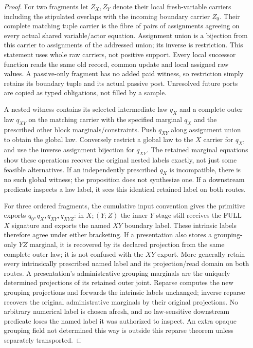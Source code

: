 \documentclass[11pt]{article}\usepackage{amsmath,amssymb,amsthm}
\begin{document}
\begin{proof}
For two fragments let $Z_X,Z_Y$ denote their local fresh-variable carriers including the stipulated overlaps with the incoming boundary carrier $Z_0$. Their complete matching tuple carrier is the fibre of pairs of assignments agreeing on every actual shared variable/actor equation. Assignment union is a bijection from this carrier to assignments of the addressed union; its inverse is restriction. This statement uses whole raw carriers, not positive support. Every local successor function reads the same old record, common update and local assigned raw values. A passive-only fragment has no added paid witness, so restriction simply retains its boundary tuple and its actual passive post. Unresolved future ports are copied as typed obligations, not filled by a sample.

A nested witness contains its selected intermediate law $q_X$ and a complete outer law $q_{XY}$ on the matching carrier with the specified marginal $q_X$ and the prescribed other block marginals/constraints. Push $q_{XY}$ along assignment union to obtain the global law. Conversely restrict a global law to the $X$ carrier for $q_X$, and use the inverse assignment bijection for $q_{XY}$. The retained marginal equations show these operations recover the original nested labels exactly, not just some feasible alternatives. If an independently prescribed $q_X$ is incompatible, there is no such global witness; the proposition does not synthesize one. If a downstream predicate inspects a law label, it sees this identical retained label on both routes.

For three ordered fragments, the cumulative input convention gives the primitive exports $q_0,q_X,q_{XY},q_{XYZ}$: in $X;(Y;Z)$ the inner $Y$ stage still receives the FULL $X$ signature and exports the named $XY$ boundary label. These intrinsic labels therefore agree under either bracketing. If a presentation also stores a grouping-only $YZ$ marginal, it is recovered by its declared projection from the same complete outer law; it is not confused with the $XY$ export. More generally retain every intrinsically prescribed named label and its projection/read domain on both routes. A presentation's administrative grouping marginals are the uniquely determined projections of its retained outer joint. Reparse computes the new grouping projections and forwards the intrinsic labels unchanged; inverse reparse recovers the original administrative marginals by their original projections. No arbitrary numerical label is chosen afresh, and no law-sensitive downstream predicate loses the named label it was authorized to inspect. An extra opaque grouping field not determined this way is outside this reparse theorem unless separately transported.


\end{proof}
\end{document}

